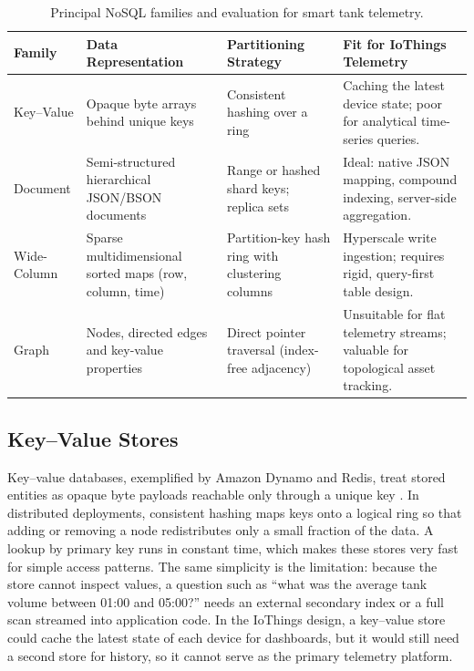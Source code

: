 \documentclass[11pt,a4paper]{article}
\begin{document}
\begin{table}[htbp]
\centering\small
\caption{Principal NoSQL families and evaluation for smart tank telemetry.}\label{tab:families}
\renewcommand{\arraystretch}{1.3}
\begin{tabularx}{\textwidth}{|l|Y|Y|Y|}
\hline
\textbf{Family} & \textbf{Data Representation} & \textbf{Partitioning Strategy} & \textbf{Fit for IoThings Telemetry}\\
\hline
Key--Value & Opaque byte arrays behind unique keys & Consistent hashing over a ring & Caching the latest device state; poor for analytical time-series queries.\\
\hline
Document & Semi-structured hierarchical JSON/BSON documents & Range or hashed shard keys; replica sets & Ideal: native JSON mapping, compound indexing, server-side aggregation.\\
\hline
Wide-Column & Sparse multidimensional sorted maps (row, column, time) & Partition-key hash ring with clustering columns & Hyperscale write ingestion; requires rigid, query-first table design.\\
\hline
Graph & Nodes, directed edges and key-value properties & Direct pointer traversal (index-free adjacency) & Unsuitable for flat telemetry streams; valuable for topological asset tracking.\\
\hline
\end{tabularx}
\end{table}

\subsection{Key--Value Stores}
Key--value databases, exemplified by Amazon Dynamo and Redis, treat stored entities as opaque byte payloads reachable only through a unique key \citep{decandia2007}. In distributed deployments, consistent hashing maps keys onto a logical ring so that adding or removing a node redistributes only a small fraction of the data. A lookup by primary key runs in constant time, which makes these stores very fast for simple access patterns. The same simplicity is the limitation: because the store cannot inspect values, a question such as ``what was the average tank volume between 01:00 and 05:00?'' needs an external secondary index or a full scan streamed into application code. In the IoThings design, a key--value store could cache the latest state of each device for dashboards, but it would still need a second store for history, so it cannot serve as the primary telemetry platform.
\end{document}
